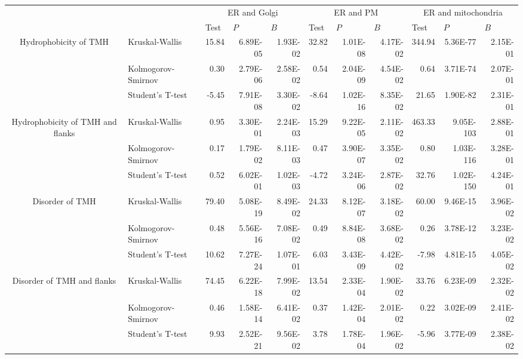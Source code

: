 \begin{table}[htbp]
		\begin{tabular}{clrrrrrrrrr}
								&       & \multicolumn{3}{c}{ER and Golgi} & \multicolumn{3}{c}{ER and PM} & \multicolumn{3}{c}{ER and mitochondria} \\
								&       & \multicolumn{1}{l}{ Test} & \multicolumn{1}{l}{ $P$} & \multicolumn{1}{l}{ $B$} & \multicolumn{1}{l}{ Test} & \multicolumn{1}{l}{ $P$} & \multicolumn{1}{l}{ $B$} & \multicolumn{1}{l}{ Test} & \multicolumn{1}{l}{ $P$} & \multicolumn{1}{l}{ $B$} \\
		\multirow{3}[0]{*}{Hydrophobicity of TMH } &  Kruskal-Wallis & 15.84 & 6.89E-05 & 1.93E-02 & 32.82 & 1.01E-08 & 4.17E-02 & 344.94 & 5.36E-77 & 2.15E-01 \\
								&  Kolmogorov-Smirnov & 0.30  & 2.79E-06 & 2.58E-02 & 0.54  & 2.04E-09 & 4.54E-02 & 0.64  & 3.71E-74 & 2.07E-01 \\
								&  Student's T-test & -5.45 & 7.91E-08 & 3.30E-02 & -8.64 & 1.02E-16 & 8.35E-02 & 21.65 & 1.90E-82 & 2.31E-01 \\
		\multirow{3}[0]{*}{Hydrophobicity of TMH and flanks } &  Kruskal-Wallis & 0.95  & 3.30E-01 & 2.24E-03 & 15.29 & 9.22E-05 & 2.11E-02 & 463.33 & 9.05E-103 & 2.88E-01 \\
								&  Kolmogorov-Smirnov & 0.17  & 1.79E-02 & 8.11E-03 & 0.47  & 3.90E-07 & 3.35E-02 & 0.80  & 1.03E-116 & 3.28E-01 \\
								&  Student's T-test & 0.52  & 6.02E-01 & 1.02E-03 & -4.72 & 3.24E-06 & 2.87E-02 & 32.76 & 1.02E-150 & 4.24E-01 \\
		\multirow{3}[0]{*}{Disorder of TMH } &  Kruskal-Wallis & 79.40 & 5.08E-19 & 8.49E-02 & 24.33 & 8.12E-07 & 3.18E-02 & 60.00 & 9.46E-15 & 3.96E-02 \\
								&  Kolmogorov-Smirnov & 0.48  & 5.56E-16 & 7.08E-02 & 0.49  & 8.84E-08 & 3.68E-02 & 0.26  & 3.78E-12 & 3.23E-02 \\
								&  Student's T-test & 10.62 & 7.27E-24 & 1.07E-01 & 6.03  & 3.43E-09 & 4.42E-02 & -7.98 & 4.81E-15 & 4.05E-02 \\
		\multirow{3}[0]{*}{Disorder of TMH and flanks } &  Kruskal-Wallis & 74.45 & 6.22E-18 & 7.99E-02 & 13.54 & 2.33E-04 & 1.90E-02 & 33.76 & 6.23E-09 & 2.32E-02 \\
								&  Kolmogorov-Smirnov & 0.46  & 1.58E-14 & 6.41E-02 & 0.37  & 1.42E-04 & 2.01E-02 & 0.22  & 3.02E-09 & 2.41E-02 \\
								&  Student's T-test & 9.93  & 2.52E-21 & 9.56E-02 & 3.78  & 1.78E-04 & 1.96E-02 & -5.96 & 3.77E-09 & 2.38E-02 \\

\end{tabular}
\end{table}
